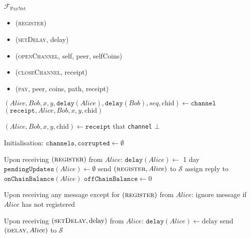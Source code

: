 \begin{functionality}{$\mathcal{F}_{\mathrm{PayNet}}$}
  \label{alg:payfunc}
    \begin{itemize}
      \item (\textsc{register})
      \item (\textsc{setDelay}, delay)
      \item (\textsc{openChannel}, self, peer, selfCoins)
      \item (\textsc{closeChannel}, receipt)
      \item (\textsc{pay}, peer, coins, path, receipt)
    \end{itemize}

  \begin{algorithmic}[1]
      \State $\left(Alice, Bob, x, y, \mathtt{delay}\left(Alice\right),
      \mathtt{delay}\left(Bob\right), seq, \mathrm{chid}\right) \gets
      \mathtt{channel}$
      \State \Return $\left(\mathtt{receipt}, Alice, Bob, x, y,
      \mathrm{chid}\right)$
    \EndFunction
    \State

      \State $\left(Alice, Bob, x, y, \mathrm{chid}\right) \gets
      \mathtt{receipt}$
        \State \Return that \texttt{channel}
      \Else
        \State \Return $\bot$
      \EndIf
    \EndFunction
    \State

    \State Initialisation:
    \Indent
      \State $\mathtt{channels}, \mathtt{corrupted} \gets \emptyset$
    \EndIndent
    \State

    \State Upon receiving $\left(\textsc{register}\right)$ from $Alice$:
    \Indent
      \State $\mathtt{delay}\left(Alice\right) \gets$ 1 day 
      \State $\mathtt{pendingUpdates}\left(Alice\right) \gets \emptyset$
      \State send $\left(\textsc{register}, Alice\right)$ to $\mathcal{S}$
      \State assign reply to $\mathtt{onChainBalance}\left(Alice\right)$
      \State $\mathtt{offChainBalance} \gets 0$
    \EndIndent
    \State

    \State Upon receiving any message except for
    $\left(\textsc{register}\right)$ from $Alice$:
    \Indent
      \State ignore message if $Alice$ has not registered
    \EndIndent
    \State

    \State Upon receiving $\left(\textsc{setDelay}, \mathrm{delay}\right)$ from
    $Alice$:
    \Indent
      \State $\mathtt{delay}\left(Alice\right) \gets \mathrm{delay}$
      \State send $\left(\textsc{delay}, Alice\right)$ to $\mathcal{S}$
    \EndIndent
    \State


\end{algorithmic}
\end{functionality}
